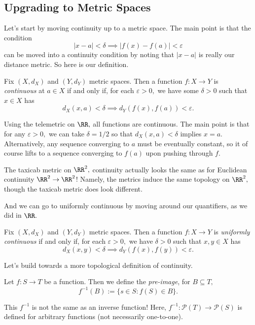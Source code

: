 \documentclass[../notes.tex]{subfiles}
\begin{document}
\subsection{Upgrading to Metric Spaces}
Let's start by moving continuity up to a metric space. The main point is that the condition
\[|x-a|<\delta\implies|f(x)-f(a)|<\varepsilon\]
can be moved into a continuity condition by noting that $|x-a|$ is really our distance metric. So here is our definition.
\begin{definition}
	Fix $(X,d_X)$ and $(Y,d_Y)$ metric spaces. Then a function $f:X\to Y$ is \textit{continuous} at $a\in X$ if and only if, for each $\varepsilon>0,$ we have some $\delta>0$ such that $x\in X$ has
	\[d_X(x,a)<\delta\implies d_Y(f(x),f(a))<\varepsilon.\]
\end{definition}
\begin{example}
	Using the telemetric on $\RR,$ all functions are continuous. The main point is that for any $\varepsilon>0,$ we can take $\delta=1/2$ so that $d_X(x,a)<\delta$ implies $x=a.$ Alternatively, any sequence converging to $a$ must be eventually constant, so it of course lifts to a sequence converging to $f(a)$ upon pushing through $f.$
\end{example}
\begin{example}
	The taxicab metric on $\RR^2,$ continuity actually looks the same as for Euclidean continuity $\RR^2\to\RR^2$! Namely, the metrics induce the same topology on $\RR^2,$ though the taxicab metric does look different.
\end{example}
And we can go to uniformly continuous by moving around our quantifiers, as we did in $\RR.$
\begin{definition}
	Fix $(X,d_X)$ and $(Y,d_Y)$ metric spaces. Then a function $f:X\to Y$ is \textit{uniformly continuous} if and only if, for each $\varepsilon>0,$ we have $\delta>0$ such that $x,y\in X$ has
	\[d_X(x,y)<\delta\implies d_Y(f(x),f(y))<\varepsilon.\]
\end{definition}
Let's build towards a more topological definition of continuity.
\begin{definition}
	Let $f:S\to T$ be a function. Then we define the \textit{pre-image}, for $B\subseteq T,$
	\[f^{-1}(B):=\{s\in S:f(S)\in B\}.\]
\end{definition}
\begin{warn}
	This $f^{-1}$ is not the same as an inverse function! Here, $f^{-1}:\mathcal P(T)\to\mathcal P(S)$ is defined for arbitrary functions (not necessarily one-to-one).
\end{warn}
\end{document}
